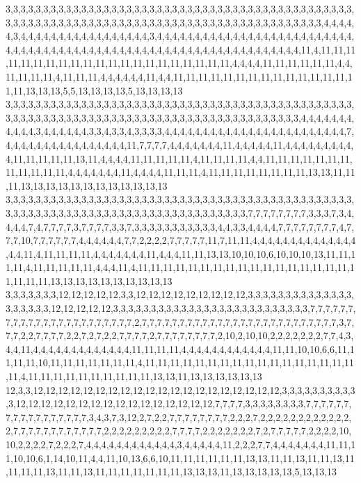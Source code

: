 3,3,3,3,3,3,3,3,3,3,3,3,3,3,3,3,3,3,3,3,3,3,3,3,3,3,3,3,3,3,3,3,3,3,3,3,3,3,3,3,3,3,3,3,3,3,3,3,3,3,3,3,3,3,3,3,3,3,3,3,3,3,3,3,3,3,3,3,3,3,3,3,3,3,3,3,3,3,3,3,3,3,3,3,3,3,3,3,4,4,4,4,4,3,4,4,4,4,4,4,4,4,4,4,4,4,4,4,4,4,4,3,4,4,4,4,4,4,4,4,4,4,4,4,4,4,4,4,4,4,4,4,4,4,4,4,4,4,4,4,4,4,4,4,4,4,4,4,4,4,4,4,4,4,4,4,4,4,4,4,4,4,4,4,4,4,4,4,4,4,4,4,4,4,4,4,4,11,4,11,11,11,11,11,11,11,11,11,11,11,11,11,11,11,11,11,11,11,11,11,4,4,4,4,11,11,11,11,11,11,4,4,11,11,11,11,4,11,11,11,4,4,4,4,4,4,11,4,4,11,11,11,11,11,11,11,11,11,11,11,11,11,11,11,11,13,13,13,5,5,13,13,13,13,5,13,13,13,13
3,3,3,3,3,3,3,3,3,3,3,3,3,3,3,3,3,3,3,3,3,3,3,3,3,3,3,3,3,3,3,3,3,3,3,3,3,3,3,3,3,3,3,3,3,3,3,3,3,3,3,3,3,3,3,3,3,3,3,3,3,3,3,3,3,3,3,3,3,3,3,3,3,3,3,3,3,3,3,3,3,3,3,3,3,4,4,4,4,4,4,4,4,4,4,4,3,4,4,4,4,4,4,3,3,4,3,3,4,3,3,3,3,4,4,4,4,4,4,4,4,4,4,4,4,4,4,4,4,4,4,4,4,4,4,4,4,7,4,4,4,4,4,4,4,4,4,4,4,4,4,4,4,4,11,7,7,7,7,4,4,4,4,4,4,4,11,4,4,4,4,4,11,4,4,4,4,4,4,4,4,4,4,11,11,11,11,11,13,11,4,4,4,4,11,11,11,11,11,4,11,11,11,11,4,4,11,11,11,11,11,11,11,11,11,11,11,11,4,4,4,4,4,4,4,11,4,4,4,4,11,11,11,4,11,11,11,11,11,11,11,11,13,13,11,11,11,13,13,13,13,13,13,13,13,13,13,13,13
3,3,3,3,3,3,3,3,3,3,3,3,3,3,3,3,3,3,3,3,3,3,3,3,3,3,3,3,3,3,3,3,3,3,3,3,3,3,3,3,3,3,3,3,3,3,3,3,3,3,3,3,3,3,3,3,3,3,3,3,3,3,3,3,3,3,3,3,3,3,3,3,3,3,3,3,3,3,7,7,7,7,7,7,7,7,3,3,3,7,3,4,4,4,4,7,4,7,7,7,7,3,7,7,7,7,3,3,7,3,3,3,3,3,3,3,3,3,3,3,4,4,3,3,4,4,4,4,7,7,7,7,7,7,7,7,4,7,7,7,10,7,7,7,7,7,7,4,4,4,4,4,4,7,7,2,2,2,2,7,7,7,7,7,11,7,11,11,4,4,4,4,4,4,4,4,4,4,4,4,4,4,4,4,11,4,11,11,11,11,4,4,4,4,4,4,4,11,4,4,4,11,11,13,13,10,10,10,6,10,10,10,13,11,11,11,11,4,11,11,11,11,11,4,4,4,11,4,11,11,11,11,11,11,11,11,11,11,11,11,11,11,11,11,11,11,11,11,11,13,13,13,13,13,13,13,13,13,13
3,3,3,3,3,3,3,12,12,12,12,12,3,3,12,12,12,12,12,12,12,12,12,3,3,3,3,3,3,3,3,3,3,3,3,3,3,3,3,3,3,3,3,12,12,12,12,12,3,3,3,3,3,3,3,3,3,3,3,3,3,3,3,3,3,3,3,3,3,3,3,3,3,3,7,7,7,7,7,7,7,7,7,7,7,7,7,7,7,7,7,7,7,7,7,7,7,2,7,7,7,7,7,7,7,7,7,7,7,7,7,7,7,7,7,7,7,7,7,7,7,7,7,7,3,7,7,7,2,2,7,7,7,7,2,2,7,2,7,2,2,7,7,7,7,2,7,7,7,7,7,7,7,7,2,10,2,10,10,2,2,2,2,2,2,2,7,7,4,3,4,4,11,4,4,4,4,4,4,4,4,4,4,4,4,4,11,11,11,11,4,4,4,4,4,4,4,4,4,4,4,4,11,11,10,10,6,6,11,11,11,11,10,11,11,11,11,11,11,11,4,11,11,11,11,11,11,11,11,11,11,11,11,11,11,11,11,11,11,4,11,11,11,11,11,11,11,11,11,11,13,13,11,13,13,13,13,13,13
12,3,3,12,12,12,12,12,12,12,12,12,12,12,12,12,12,12,12,12,12,12,12,3,3,3,3,3,3,3,3,3,3,3,12,12,12,12,12,12,12,12,12,12,12,12,12,12,12,12,7,7,7,7,3,3,3,3,3,3,3,3,7,7,7,7,7,7,7,7,7,7,7,7,7,7,7,7,7,3,4,3,7,3,12,2,7,2,2,7,7,7,7,7,7,7,7,2,2,2,7,2,2,2,2,2,2,2,2,2,2,2,2,2,7,7,7,7,7,7,7,7,7,7,7,7,2,2,2,2,2,2,2,2,2,7,7,7,7,2,2,2,2,2,2,2,7,2,7,7,7,7,7,2,2,2,2,10,10,2,2,2,2,7,2,2,2,7,4,4,4,4,4,4,4,4,4,4,4,4,3,4,4,4,4,4,11,2,2,2,7,7,4,4,4,4,4,4,4,11,11,11,10,10,6,1,14,10,11,4,4,11,10,13,6,6,10,11,11,11,11,11,11,13,13,11,11,13,11,11,13,11,11,11,11,13,11,11,13,11,11,11,11,11,11,11,13,13,13,11,13,13,13,13,13,5,13,13,13

